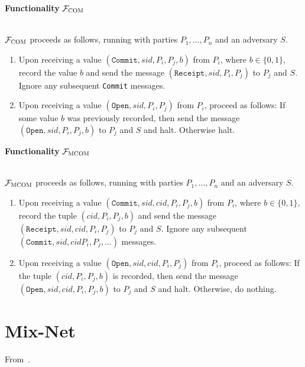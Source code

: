 \documentclass[a4paper]{article}
\newcommand{\F}{\mathcal{F}}
\begin{document}
\begin{framed}
    \centerline{\textbf{Functionality} $\F_{\textsc{COM}}$}
    \ \\
    \noindent $\F_{\textsc{COM}}$ proceeds as follows, running with parties $P_1, \ldots, P_n$ and an adversary $S$.
    
    \begin{enumerate}
        \item Upon receiving a value $(\texttt{Commit}, sid, P_i, P_j, b)$ from $P_i$, where $b \in \{ 0, 1 \}$, record the value $b$ and send the message $(\texttt{Receipt}, sid, P_i, P_j)$ to $P_j$ and $S$. Ignore any subsequent \texttt{Commit} messages.

        \item Upon receiving a value $(\texttt{Open}, sid, P_i, P_j)$ from $P_i$, proceed as follows: If some value $b$ was previously recorded, then send the message $(\texttt{Open}, sid, P_i, P_j, b)$ to $P_j$ and $S$ and halt. Otherwise halt.
    \end{enumerate}
\end{framed}



\begin{framed}
    \centerline{\textbf{Functionality} $\F_{\textsc{MCOM}}$}
    \ \\
    \noindent $\F_{\textsc{MCOM}}$ proceeds as follows, running with parties $P_1, \ldots, P_n$ and an adversary $S$.
    
    \begin{enumerate}
        \item Upon receiving a value $(\texttt{Commit}, sid, cid, P_i, P_j, b)$ from $P_i$, where $b \in \{ 0, 1 \}$, record the tuple $(cid, P_i, P_j, b)$ and send the message $(\texttt{Receipt}, sid, cid, P_i, P_j)$ to $P_j$ and $S$. Ignore any subsequent $(\texttt{Commit}, sid, cid P_i, P_j, \ldots)$ messages.

        \item Upon receiving a value $(\texttt{Open}, sid, cid, P_i, P_j)$ from $P_i$, proceed as follows: If the tuple $(cid, P_i, P_j, b)$ is recorded, then send the message $(\texttt{Open}, sid, cid, P_i, P_j, b)$ to $P_j$ and $S$ and halt. Otherwise, do nothing.
    \end{enumerate}
\end{framed}



\section{Mix-Net}
From~\cite{wikstrom2004universally}.
\end{document}

